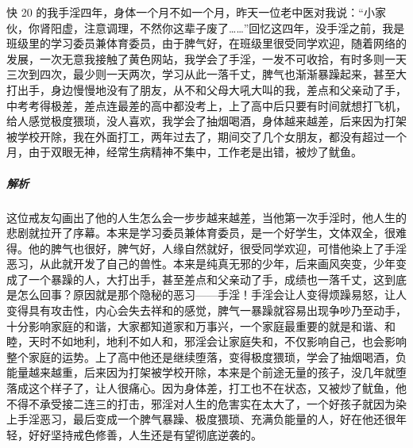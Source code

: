 \begin{case}
    快 20 的我手淫四年，身体一个月不如一个月，昨天一位老中医对我说：“小家伙，你肾阳虚，注意调理，不然你这辈子废了……”回忆这四年，没手淫之前，我是班级里的学习委员兼体育委员，由于脾气好，在班级里很受同学欢迎，随着网络的发展，一次无意我接触了黄色网站，我学会了手淫，一发不可收拾，有时多则一天三次到四次，最少则一天两次，学习从此一落千丈，脾气也渐渐暴躁起来，甚至大打出手，身边慢慢地没有了朋友，从不和父母大吼大叫的我，差点和父亲动了手，中考考得极差，差点连最差的高中都没考上，上了高中后只要有时间就想打飞机，给人感觉极度猥琐，没人喜欢，我学会了抽烟喝酒，身体越来越差，后来因为打架被学校开除，我在外面打工，两年过去了，期间交了几个女朋友，都没有超过一个月，由于双眼无神，经常生病精神不集中，工作老是出错，被炒了鱿鱼。
    \subparagraph{解析} 这位戒友勾画出了他的人生怎么会一步步越来越差，当他第一次手淫时，他人生的悲剧就拉开了序幕。本来是学习委员兼体育委员，是一个好学生，文体双全，很难得。他的脾气也很好，脾气好，人缘自然就好，很受同学欢迎，可惜他染上了手淫恶习，从此就开发了自己的兽性。本来是纯真无邪的少年，后来画风突变，少年变成了一个暴躁的人，大打出手，甚至差点和父亲动了手，成绩也一落千丈，这到底是怎么回事？原因就是那个隐秘的恶习——手淫！手淫会让人变得烦躁易怒，让人变得具有攻击性，内心会失去祥和的感觉，脾气一暴躁就容易出现争吵乃至动手，十分影响家庭的和谐，大家都知道家和万事兴，一个家庭最重要的就是和谐、和睦，天时不如地利，地利不如人和，邪淫会让家庭失和，不仅影响自己，也会影响整个家庭的运势。上了高中他还是继续堕落，变得极度猥琐，学会了抽烟喝酒，负能量越来越重，后来因为打架被学校开除，本来是个前途无量的孩子，没几年就堕落成这个样子了，让人很痛心。因为身体差，打工也不在状态，又被炒了鱿鱼，他不得不承受接二连三的打击，邪淫对人生的危害实在太大了，一个好孩子就因为染上手淫恶习，最后变成一个脾气暴躁、极度猥琐、充满负能量的人，好在他还很年轻，好好坚持戒色修善，人生还是有望彻底逆袭的。
\end{case}

